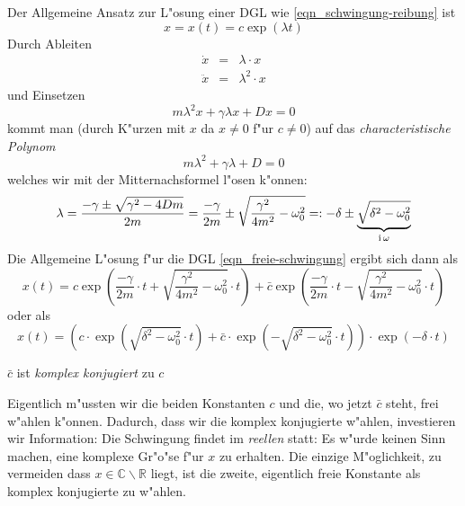 Der Allgemeine Ansatz zur L"osung einer DGL wie
\eqref{eqn_schwingung-reibung} ist 
\begin{equation}
   \label{eq:119}
  x =    x(t) = c \exp(\lambda t)
\end{equation}
Durch Ableiten 
\begin{eqnarray}
   \label{eq:120}
   \dot x &=& \lambda \cdot x\\
 \ddot x &=& \lambda^2 \cdot x
\end{eqnarray}
und Einsetzen
\begin{equation}
   \label{eq:121}
   m \lambda^2 x + \gamma \lambda x + D x = 0
\end{equation}
kommt man (durch K"urzen mit $x$ da $x \neq 0$ f"ur $c \neq 0$) auf das
\emph{characteristische Polynom}
\begin{equation}
   \label{eq:122}
    m \lambda^2 + \gamma \lambda + D  = 0
\end{equation}
welches wir mit der Mitternachsformel l"osen k"onnen:
\begin{equation}
   \label{eq:123}
   \lambda = \frac{-\gamma \pm \sqrt{\gamma^2 - 4Dm}}{2m}
 = 
\frac{- \gamma }{2m} \pm \sqrt{\frac{\gamma^2}{4m^2} - \omega_0^2}
=:
- \delta \pm \underbrace{\sqrt{\delta^2 - \omega_0^2}}_{\operatorname{i} \omega}
\end{equation}
Die Allgemeine L"osung f"ur die DGL \eqref{eqn_freie-schwingung} ergibt
sich dann als
\begin{equation}
   \label{eq:124}
   x(t) = c \exp \left (\frac{- \gamma }{2m} \cdot t + \sqrt{\frac{\gamma^2}{4m^2} -  \omega_0^2}  \cdot t\right ) + \bar c \exp \left ( \frac{-
        \gamma }{2m} \cdot t- \sqrt{\frac{\gamma^2}{4m^2}
        - \omega_0^2}  \cdot t\right )
\end{equation}
oder als
\begin{equation*}
x(t) = \left ( c \cdot \exp( \sqrt{\delta^2 - \omega_0^2} \cdot t) + \bar
   c \cdot \exp(- \sqrt{\delta^2 - \omega_0^2}\cdot t)  \right) \cdot
\exp(-\delta \cdot t)
\end{equation*}
\begin{Wichtig}
$\bar c$ ist \emph{komplex konjugiert} zu $c$
\end{Wichtig}
Eigentlich m"ussten wir die beiden Konstanten $c$ und die, wo jetzt
$\bar c$ steht, frei w"ahlen k"onnen. Dadurch, dass wir die komplex
konjugierte w"ahlen, investieren wir Information: Die Schwingung findet
im \emph{reellen} statt: Es w"urde keinen Sinn machen, eine komplexe
Gr"o"se f"ur $x$ zu erhalten. Die einzige M"oglichkeit, zu vermeiden dass
$x \in \mathbb C \backslash \mathbb R$ liegt, ist die zweite,
eigentlich freie Konstante als komplex konjugierte zu w"ahlen.

